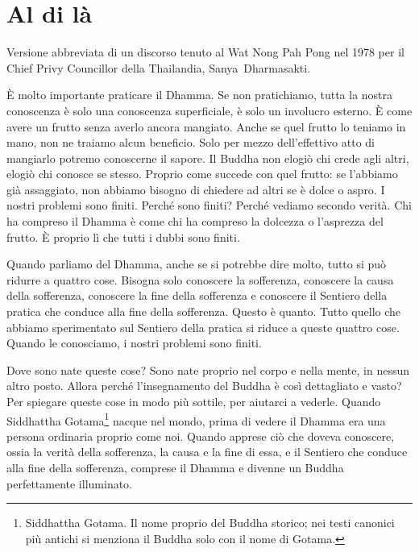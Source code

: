 \chapter{Al di là}

\begin{openingQuote}
  \centering

  Versione abbreviata di un discorso tenuto al Wat Nong Pah Pong nel 1978 per il
  Chief Privy Councillor della Thailandia, Sanya~Dharmasakti.
\end{openingQuote}

È molto importante praticare il Dhamma. Se non pratichiamo, tutta la
nostra conoscenza è solo una conoscenza superficiale, è solo un
involucro esterno. È come avere un frutto senza averlo ancora mangiato.
Anche se quel frutto lo teniamo in mano, non ne traiamo alcun beneficio.
Solo per mezzo dell'effettivo atto di mangiarlo potremo conoscerne il
sapore. Il Buddha non elogiò chi crede agli altri, elogiò chi conosce se
stesso. Proprio come succede con quel frutto: se l'abbiamo già
assaggiato, non abbiamo bisogno di chiedere ad altri se è dolce o aspro.
I nostri problemi sono finiti. Perché sono finiti? Perché vediamo
secondo verità. Chi ha compreso il Dhamma è come chi ha compreso la
dolcezza o l'asprezza del frutto. È proprio lì che tutti i dubbi sono
finiti.

Quando parliamo del Dhamma, anche se si potrebbe dire molto, tutto si
può ridurre a quattro cose. Bisogna solo conoscere la sofferenza,
conoscere la causa della sofferenza, conoscere la fine della sofferenza
e conoscere il Sentiero della pratica che conduce alla fine della
sofferenza. Questo è quanto. Tutto quello che abbiamo sperimentato sul
Sentiero della pratica si riduce a queste quattro cose. Quando le
conosciamo, i nostri problemi sono finiti.

Dove sono nate queste cose? Sono nate proprio nel corpo e nella mente,
in nessun altro posto. Allora perché l'insegnamento del Buddha è così
dettagliato e vasto? Per spiegare queste cose in modo più sottile, per
aiutarci a vederle. Quando Siddhattha Gotama\footnote{Siddhattha Gotama.
  Il nome proprio del Buddha storico; nei testi canonici più antichi si
  menziona il Buddha solo con il nome di Gotama.} nacque nel mondo,
prima di vedere il Dhamma era una persona ordinaria proprio come noi.
Quando apprese ciò che doveva conoscere, ossia la verità della
sofferenza, la causa e la fine di essa, e il Sentiero che conduce alla
fine della sofferenza, comprese il Dhamma e divenne un Buddha
perfettamente illuminato.

